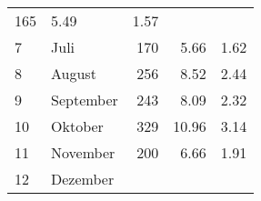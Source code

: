 \begin{longtable}{lXrrr}
       \num{165} &
       \num[round-mode=places,round-precision=2]{5.49} &
         \num[round-mode=places,round-precision=2]{1.57} \\

     7 &
     \multicolumn{1}{X}{ Juli   } &


       \num{170} &
       \num[round-mode=places,round-precision=2]{5.66} &
         \num[round-mode=places,round-precision=2]{1.62} \\

     8 &
     \multicolumn{1}{X}{ August   } &


       \num{256} &
       \num[round-mode=places,round-precision=2]{8.52} &
         \num[round-mode=places,round-precision=2]{2.44} \\

     9 &
     \multicolumn{1}{X}{ September   } &


       \num{243} &
       \num[round-mode=places,round-precision=2]{8.09} &
         \num[round-mode=places,round-precision=2]{2.32} \\

     10 &
     \multicolumn{1}{X}{ Oktober   } &


       \num{329} &
       \num[round-mode=places,round-precision=2]{10.96} &
         \num[round-mode=places,round-precision=2]{3.14} \\

     11 &
     \multicolumn{1}{X}{ November   } &


       \num{200} &
       \num[round-mode=places,round-precision=2]{6.66} &
         \num[round-mode=places,round-precision=2]{1.91} \\

     12 &
     \multicolumn{1}{X}{ Dezember   } &



\end{longtable}
